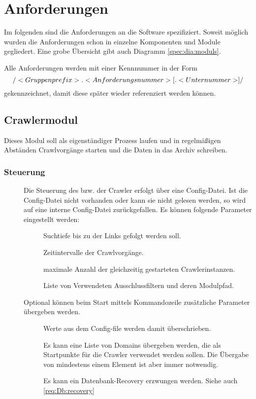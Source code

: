 \chapter{Anforderungen}
Im folgenden sind die Anforderungen an die Software spezifiziert. Soweit möglich wurden
die Anforderungen schon in einzelne Komponenten und Module gegliedert. Eine grobe Übersicht gibt auch Diagramm \ref{spec:dia:moduls}.

Alle Anforderungen werden mit einer Kennnummer in der Form 
\[ \text{/}<Gruppenprefix> . <Anforderungsnummer> [. <Unternummer> ]\text{/} \]
gekennzeichnet, damit diese später wieder referenziert werden können.

\section{Crawlermodul}
Dieses Modul soll als eigenständiger Prozess laufen und in regelmäßigen Abständen Crawlvorgänge starten
und die Daten in das Archiv schreiben.

\subsection{Steuerung}
\begin{description}
	\item []
		Die Steuerung des bzw. der Crawler erfolgt über eine Config-Datei.
		Ist die Config-Datei nicht vorhanden oder kann sie nicht gelesen werden,
        so wird auf eine interne Config-Datei zurückgefallen.
		Es können folgende Parameter eingestellt werden:
		\begin{description}
			\item []
				Suchtiefe bis zu der Links gefolgt werden soll.
			\item []
				Zeitintervalle der Crawlvorgänge.
			\item []
				maximale Anzahl der gleichzeitig gestarteten Crawlerinstanzen.
			\item []
				Liste von Verwendeten Ausschlussfiltern und deren Modulpfad.
		\end{description}
	\item []
		Optional können beim Start mittels Kommandozeile zusätzliche Parameter übergeben werden.
		\begin{description}
			\item []
				Werte aus dem Config-file werden damit überschrieben.
			\item []
				Es kann eine Liste von Domains übergeben werden, 
				die als Startpunkte für die Crawler verwendet werden sollen.
				Die Übergabe von mindestens einem Element ist aber immer notwendig.
			\item []
				Es kann ein Datenbank-Recovery erzwungen werden. Siehe auch \ref{req:Db:recovery}
		\end{description}
\end{description}
